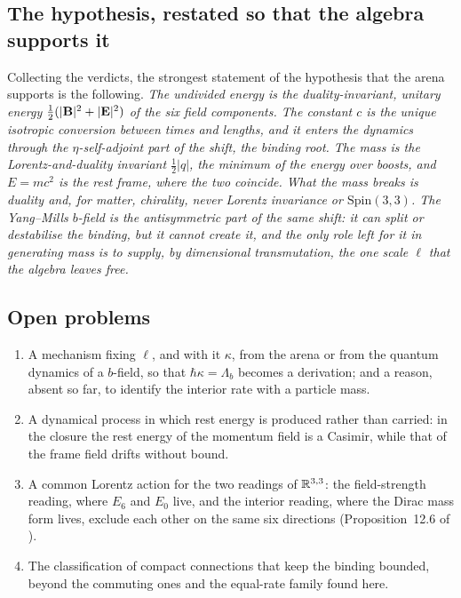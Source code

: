 \subsection{The hypothesis, restated so that the algebra supports it}

Collecting the verdicts, the strongest statement of the hypothesis that the arena supports is the following. \emph{The undivided energy
is the duality-invariant, unitary energy $\tfrac12(|\mathbf B|^2+|\mathbf E|^2)$ of the six field components. The constant $c$ is the unique isotropic
conversion between times and lengths, and it enters the dynamics through the $\eta$-self-adjoint part of the shift, the binding root. The
mass is the Lorentz-and-duality invariant $\tfrac12|q|$, the minimum of the energy over boosts, and $E=mc^2$ is the rest frame, where the
two coincide. What the mass breaks is duality and, for matter, chirality, never Lorentz invariance or $\mathrm{Spin}(3,3)$. The Yang--Mills
$b$-field is the antisymmetric part of the same shift: it can split or destabilise the binding, but it cannot create it, and the only
role left for it in generating mass is to supply, by dimensional transmutation, the one scale $\ell$ that the algebra leaves free.}

\subsection{Open problems}

\begin{enumerate}
\item A mechanism fixing $\ell$, and with it $\kappa$, from the arena or from the quantum dynamics of a $b$-field, so that $\hbar\kappa=\Lambda_b$
becomes a derivation; and a reason, absent so far, to identify the interior rate with a particle mass.
\item A dynamical process in which rest energy is produced rather than carried: in the closure the rest energy of the momentum field is a
Casimir, while that of the frame field drifts without bound.
\item A common Lorentz action for the two readings of $\mathbb{R}^{3,3}$: the field-strength reading, where $E_6$ and $E_0$ live, and the interior
reading, where the Dirac mass form lives, exclude each other on the same six directions (Proposition~12.6 of \cite{ES17}).
\item The classification of compact connections that keep the binding bounded, beyond the commuting ones and the equal-rate family found here.
\end{enumerate}
